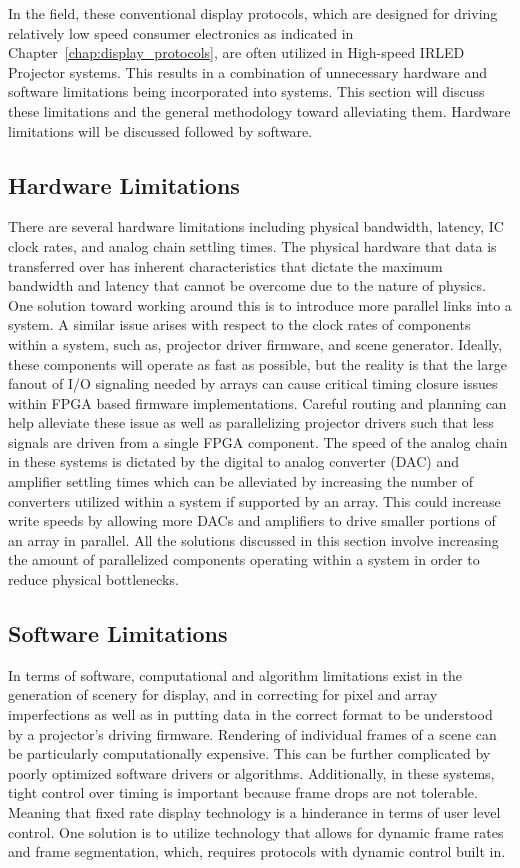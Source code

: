     In the field, these conventional display protocols, which are designed for driving relatively low speed consumer electronics as indicated in Chapter~\ref{chap:display_protocols}, are often utilized in High-speed IRLED Projector systems. This results in a combination of unnecessary hardware and software limitations being incorporated into systems. This section will discuss these limitations and the general methodology toward alleviating them. Hardware limitations will be discussed followed by software.

    \subsection{Hardware Limitations}
        There are several hardware limitations including physical bandwidth, latency, IC clock rates, and analog chain settling times. The physical hardware that data is transferred over has inherent characteristics that dictate the maximum bandwidth and latency that cannot be overcome due to the nature of physics. One solution toward working around this is to introduce more parallel links into a system. A similar issue arises with respect to the clock rates of components within a system, such as, projector driver firmware, and scene generator. Ideally, these components will operate as fast as possible, but the reality is that the large fanout of I/O signaling needed by arrays can cause critical timing closure issues within FPGA based firmware implementations. Careful routing and planning can help alleviate these issue as well as parallelizing projector drivers such that less signals are driven from a single FPGA component. The speed of the analog chain in these systems is dictated by the digital to analog converter (DAC) and amplifier settling times which can be alleviated by increasing the number of converters utilized within a system if supported by an array. This could increase write speeds by allowing more DACs and amplifiers to drive smaller portions of an array in parallel. All the solutions discussed in this section involve increasing the amount of parallelized components operating within a system in order to reduce physical bottlenecks.

    \subsection{Software Limitations}
        In terms of software, computational and algorithm limitations exist in the generation of scenery for display, and in correcting for pixel and array imperfections as well as in putting data in the correct format to be understood by a projector's driving firmware. Rendering of individual frames of a scene can be particularly computationally expensive. This can be further complicated by poorly optimized software drivers or algorithms. Additionally, in these systems, tight control over timing is important because frame drops are not tolerable. Meaning that fixed rate display technology is a hinderance in terms of user level control. One solution is to utilize technology that allows for dynamic frame rates and frame segmentation, which, requires protocols with dynamic control built in.


